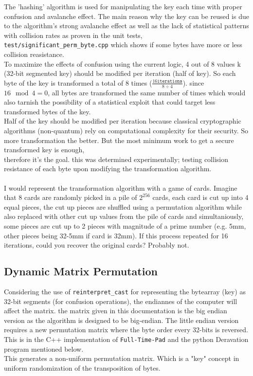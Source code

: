 \documentclass[fleqn, a4paper,12pt]{article}
\begin{document}
The 'hashing' algorithm is used for manipulating the key each time with proper confusion and avalanche effect. The main reason why the key can be reused is due to the algorithm's strong avalanche effect as well as the lack of statistical patterns with collision rates as proven in the unit tests, \texttt{test/significant\_perm\_byte.cpp} which shows if some bytes have more or less collision reasistance.
\\
To maximize the effects of confusion using the current logic, 4 out of 8 values k (32-bit segmented key) should be modified per iteration (half of key). So each byte of the key is transformed a total of 8 times ($\frac{16 \texttt{iterations}}{8 \div 4}$). since $16 \mod 4 = 0$, all bytes are transformed the same number of times which would also tarnish the possibility of a statistical exploit that could target less transformed bytes of the key.
\\
Half of the key should be modified per iteration because classical cryptographic algorithms (non-quantum) rely on computational complexity for their security. So more transformation the better. But the most minimum work to get a secure transformed key is enough, \\
therefore it's the goal. this was determined experimentally; testing collision resistance of each byte upon modifying the transformation algorithm. \\
\\

I would represent the transformation algorithm with a game of cards. Imagine that 8 cards are randomly picked in a pile of $2^{256}$ cards, each card is cut up into 4 equal pieces, the cut up pieces are shuffled using a permutation algorithm while also replaced with other cut up values from the pile of cards and simultaniously, some pieces are cut up to 2 pieces with magnitude of a prime number (e.g. 5mm, other pieces being 32-5mm if card is 32mm). If this process repeated for 16 iterations, could you recover the original cards? Probably not.

\subsection{Dynamic Matrix Permutation}

Considering the use of \texttt{reinterpret\_cast} for representing the bytearray (key) as 32-bit segments (for confusion operations), the endiannes of the computer will affect the matrix. the matrix given in this documentation is the big endian version as the algorithm is designed to be big-endian. The little endian version requires a new permutation matrix where the byte order every 32-bits is reversed. This is in the C++ implementation of \texttt{Full-Time-Pad} and the python Deravation program mentioned below.
\\
This generates a non-uniform permutation matrix. Which is a "key" concept in uniform randomization of the transposition of bytes.
\end{document}

